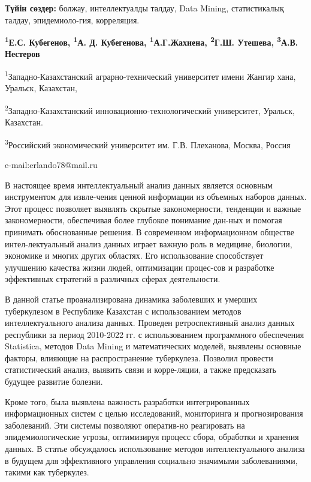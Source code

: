 {\bfseries Түйін сөздер:} болжау, интеллектуалды талдау, Data Mining,
статистикалық талдау, эпидемиоло-гия, корреляция.


\begin{center}
{\bfseries \textsuperscript{1}Е.С. Кубегенов\envelope,
\textsuperscript{1}А. Д. Кубегенова, \textsuperscript{1}А.Г.Жахиена,
\textsuperscript{2}Г.Ш. Утешева, \textsuperscript{3}А.В. Нестеров}

\textsuperscript{1}Западно-Казахстанский аграрно-технический университет
имени Жангир хана, Уральск, Казахстан,

\textsuperscript{2}Западно-Казахстанский инновационно-технологический
университет, Уральск, Казахстан.

\textsuperscript{3}Российский экономический университет им. Г.В.
Плеханова, Москва, Россия

e-mail:erlando78@mail.ru
\end{center}

В настоящее время интеллектуальный анализ данных является основным
инструментом для извле-чения ценной информации из объемных наборов
данных. Этот процесс позволяет выявлять скрытые закономерности,
тенденции и важные закономерности, обеспечивая более глубокое понимание
дан-ных и помогая принимать обоснованные решения. В современном
информационном обществе интел-лектуальный анализ данных играет важную
роль в медицине, биологии, экономике и многих других областях. Его
использование способствует улучшению качества жизни людей, оптимизации
процес-сов и разработке эффективных стратегий в различных сферах
деятельности.

В данной статье проанализирована динамика заболевших и умерших
туберкулезом в Республике Казахстан с использованием методов
интеллектуального анализа данных. Проведен ретроспективный анализ данных
республики за период 2010-2022 гг. с использованием программного
обеспечения Statistica, методов Data Mining и математических моделей,
выявлены основные факторы, влияющие на распространение туберкулеза.
Позволил провести статистический анализ, выявить связи и корре-ляции, а
также предсказать будущее развитие болезни.

Кроме того, была выявлена важность разработки интегрированных
информационных систем с целью исследований, мониторинга и
прогнозирования заболеваний. Эти системы позволяют оператив-но
реагировать на эпидемиологические угрозы, оптимизируя процесс сбора,
обработки и хранения данных. В статье обсуждалось использование методов
интеллектуального анализа в будущем для эффективного управления
социально значимыми заболеваниями, такими как туберкулез.

